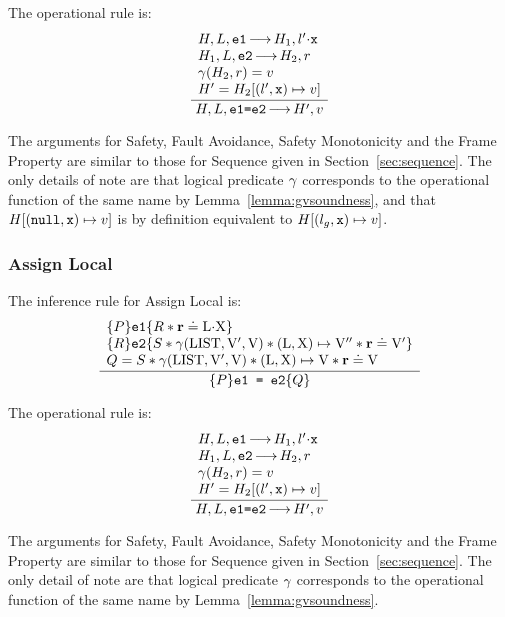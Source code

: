 \documentclass{article}
\begin{document}
The operational rule is:
\[\frac
{\begin{array}{l}
  H,L,\js{e1} \levalsto H_1,l'\sv\js{x}\\
  H_1,L,\js{e2} \levalsto H_2,\njs{r}\\
    \getValue(H_2,\njs{r}) = \njs{v}\\
  H'=H_2\semup{(l',\js{x})\pointsto\njs{v}}
\end{array}}
{H,L,\js{e1=e2} \levalsto H',\njs{v}}
\]

The arguments for Safety, Fault Avoidance, Safety Monotonicity and the Frame Property are similar to those for Sequence given in Section~\ref{sec:sequence}. The only details of note are that logical predicate $\gamma$ corresponds to the operational function of the same name by Lemma~\ref{lemma:gvsoundness}, and that $H{[(\mbox{\texttt{{\upshape null}}},\mbox{\texttt{{\upshape x}}})\mapsto v]}$ is by definition equivalent to $H{[(l_g,\mbox{\texttt{{\upshape x}}})\mapsto v]}$.

\subsubsection{Assign Local}

The inference rule for Assign Local is:
\[\frac
{\begin{array}{l}
        \tr P {\js{e1}} {R \sep\rv\doteq \V{L}\sv\V{X}}\\
\tr R {\js{e2}} {S\sep\getValue(\V{LIST},\LVAL',\LVAL) \sep (\V{L},\V{X}) \pointsto\LVAL'' \sep\rv\doteq \LVAL'}\\
Q = S\sep\getValue(\V{LIST},\LVAL',\LVAL) \sep (\V{L},\V{X})\pointsto\LVAL \sep\rv\doteq \LVAL
\end{array}}
{\tr P {\js{e1 = e2}} Q}
\]

The operational rule is:
\[\frac
{\begin{array}{l}
  H,L,\js{e1} \levalsto H_1,l'\sv\js{x}\\
  H_1,L,\js{e2} \levalsto H_2,\njs{r}\\
    \getValue(H_2,\njs{r}) = \njs{v}\\
  H'=H_2\semup{(l',\js{x})\pointsto\njs{v}}
\end{array}}
{H,L,\js{e1=e2} \levalsto H',\njs{v}}
\]

The arguments for Safety, Fault Avoidance, Safety Monotonicity and the Frame Property are similar to those for Sequence given in Section~\ref{sec:sequence}. The only detail of note are that logical predicate $\gamma$ corresponds to the operational function of the same name by Lemma~\ref{lemma:gvsoundness}.
\end{document}
